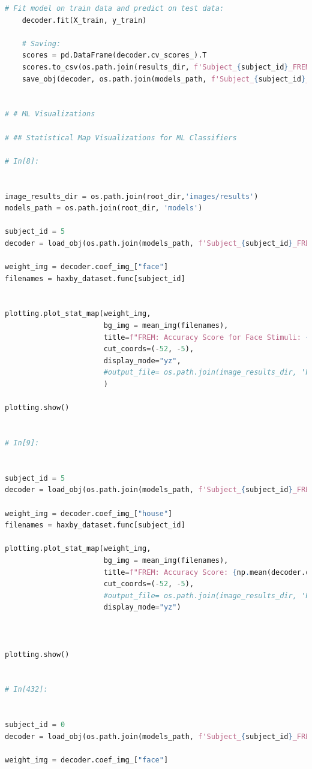 \documentclass[10pt, twocolumn, letterpaper]{article}
\begin{document}
\begin{lstlisting}[language=Python]
    # Fit model on train data and predict on test data:
    decoder.fit(X_train, y_train)
    
    # Saving:
    scores = pd.DataFrame(decoder.cv_scores_).T
    scores.to_csv(os.path.join(results_dir, f'Subject_{subject_id}_FREMLogisticRegressionCV_results.csv'))     
    save_obj(decoder, os.path.join(models_path, f'Subject_{subject_id}_FREMLogisticRegressionCV_model'))   


# # ML Visualizations

# ## Statistical Map Visualizations for ML Classifiers

# In[8]:


image_results_dir = os.path.join(root_dir,'images/results')
models_path = os.path.join(root_dir, 'models')

subject_id = 5
decoder = load_obj(os.path.join(models_path, f'Subject_{subject_id}_FREM_model'))

weight_img = decoder.coef_img_["face"]
filenames = haxby_dataset.func[subject_id]


plotting.plot_stat_map(weight_img,
                       bg_img = mean_img(filenames),
                       title=f"FREM: Accuracy Score for Face Stimuli: {np.mean(decoder.cv_scores_['face']).round(2)}",
                       cut_coords=(-52, -5),
                       display_mode="yz",
                       #output_file= os.path.join(image_results_dir, 'FREM_face.png'),
                       )

plotting.show()


# In[9]:


subject_id = 5
decoder = load_obj(os.path.join(models_path, f'Subject_{subject_id}_FREM_model'))

weight_img = decoder.coef_img_["house"]
filenames = haxby_dataset.func[subject_id]

plotting.plot_stat_map(weight_img,
                       bg_img = mean_img(filenames),
                       title=f"FREM: Accuracy Score: {np.mean(decoder.cv_scores_['house']).round(2)}",
                       cut_coords=(-52, -5),
                       #output_file= os.path.join(image_results_dir, 'FREM_house.png'),
                       display_mode="yz")



plotting.show()


# In[432]:


subject_id = 0
decoder = load_obj(os.path.join(models_path, f'Subject_{subject_id}_FREM_model'))

weight_img = decoder.coef_img_["face"]



\end{lstlisting}
\end{document}
